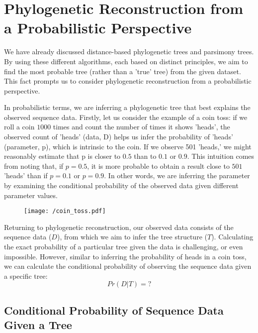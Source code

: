 \documentclass[12pt]{book}
\begin{document}
%  
\else
\fi

\chapter{Phylogenetic Reconstruction from a Probabilistic Perspective}

    We have already discussed distance-based phylogenetic trees and parsimony trees. By using these different algorithms, each based on distinct principles, we aim to find the most probable tree (rather than a 'true' tree) from the given dataset. This fact prompts us to consider phylogenetic reconstruction from a probabilistic perspective.

    In probabilistic terms, we are inferring a phylogenetic tree that best explains the observed sequence data. Firstly, let us consider the example of a coin toss: if we roll a coin $1000$ times and count the number of times it shows 'heads', the observed count of 'heads' (data, D) helps us infer the probability of 'heads' (parameter, p), which is intrinsic to the coin. If we observe 501 'heads,' we might reasonably estimate that p is closer to $0.5$ than to $0.1$ or $0.9$. This intuition comes from noting that, if $p = 0.5$, it is more probable to obtain a result close to $501$ 'heads' than if $p = 0.1$ or $p = 0.9$. In other words, we are inferring the parameter by examining the conditional probability of the observed data given different parameter values.

    \begin{figure}[htbp]
        \centering
        \texttt{[image: /coin\_toss.pdf]}
    \end{figure}

    Returning to phylogenetic reconstruction, our observed data consists of the sequence data ($D$), from which we aim to infer the tree structure ($T$). Calculating the exact probability of a particular tree given the data is challenging, or even impossible. However, similar to inferring the probability of heads in a coin toss, we can calculate the conditional probability of observing the sequence data given a specific tree:
    \begin{equation*}
        Pr(D|T) = ?
    \end{equation*}

    \section{Conditional Probability of Sequence Data Given a Tree}
    
\end{document}
